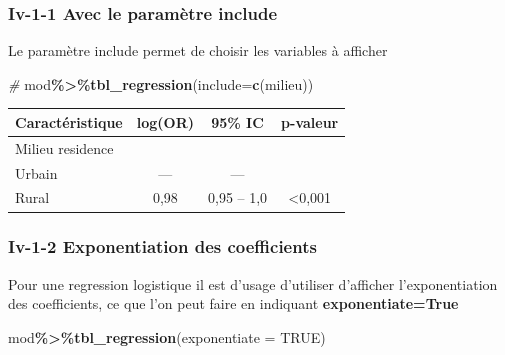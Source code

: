\documentclass[
]{article}
\newenvironment{Shaded}{\begin{snugshade}}{\end{snugshade}}
\newcommand{\AttributeTok}[1]{\textcolor[rgb]{0.13,0.29,0.53}{#1}}
\newcommand{\CommentTok}[1]{\textcolor[rgb]{0.56,0.35,0.01}{\textit{#1}}}
\newcommand{\ConstantTok}[1]{\textcolor[rgb]{0.56,0.35,0.01}{#1}}
\newcommand{\FunctionTok}[1]{\textcolor[rgb]{0.13,0.29,0.53}{\textbf{#1}}}
\newcommand{\NormalTok}[1]{#1}
\newcommand{\SpecialCharTok}[1]{\textcolor[rgb]{0.81,0.36,0.00}{\textbf{#1}}}
\begin{document}
\hypertarget{iv-1-1-avec-le-paramuxe8tre-include}{%
\subsubsection{Iv-1-1 Avec le paramètre
include}\label{iv-1-1-avec-le-paramuxe8tre-include}}

Le paramètre include permet de choisir les variables à afficher

\begin{Shaded}
\begin{Highlighting}[]
\CommentTok{\# }
\NormalTok{mod}\SpecialCharTok{\%\textgreater{}\%}\FunctionTok{tbl\_regression}\NormalTok{(}\AttributeTok{include=}\FunctionTok{c}\NormalTok{(milieu))}
\end{Highlighting}
\end{Shaded}

\begin{longtable}[]{@{}lccc@{}}
\toprule\noalign{}
\textbf{Caractéristique} & \textbf{log(OR)} & \textbf{95\% IC} &
\textbf{p-valeur} \\
\midrule\noalign{}
\endhead
\bottomrule\noalign{}
\endlastfoot
Milieu residence & & & \\
Urbain & --- & --- & \\
Rural & 0,98 & 0,95 -- 1,0 & \textless0,001 \\
\end{longtable}

\hypertarget{iv-1-2-exponentiation-des-coefficients}{%
\subsubsection{Iv-1-2 Exponentiation des
coefficients}\label{iv-1-2-exponentiation-des-coefficients}}

Pour une regression logistique il est d'usage d'utiliser d'afficher
l'exponentiation des coefficients, ce que l'on peut faire en indiquant
\textbf{exponentiate=True}

\begin{Shaded}
\begin{Highlighting}[]
\NormalTok{mod}\SpecialCharTok{\%\textgreater{}\%}\FunctionTok{tbl\_regression}\NormalTok{(}\AttributeTok{exponentiate =} \ConstantTok{TRUE}\NormalTok{)}
\end{Highlighting}
\end{Shaded}
\end{document}
